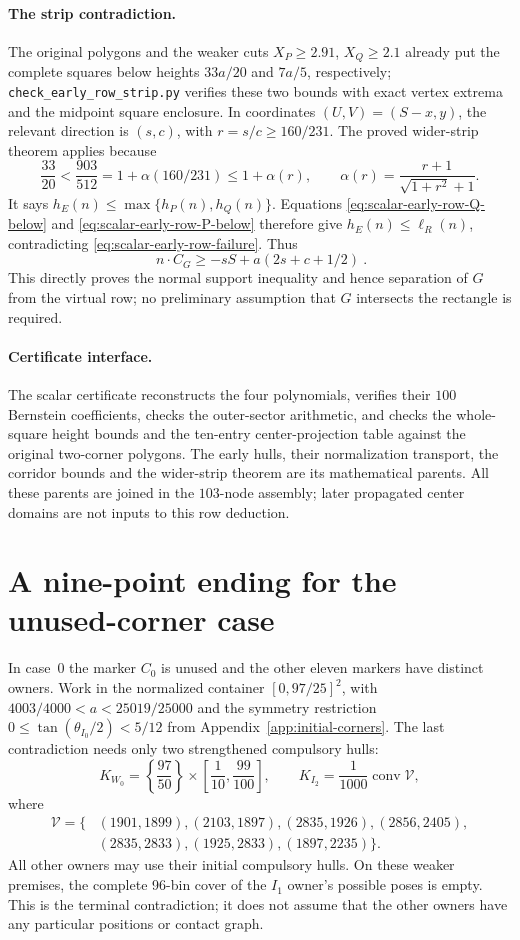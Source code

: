\documentclass[11pt]{article}
\begin{document}
\paragraph{The strip contradiction.}
The original polygons and the weaker cuts $X_P\ge2.91$, $X_Q\ge2.1$
already put the complete squares below heights $33a/20$ and $7a/5$,
respectively; \texttt{check\_early\_row\_strip.py} verifies these
two bounds with exact vertex extrema and the midpoint square enclosure.
In coordinates $(U,V)=(S-x,y)$, the relevant direction is $(s,c)$,
with $r=s/c\ge160/231$. The proved wider-strip theorem applies because
\[
 \frac{33}{20}<\frac{903}{512}
 =1+\alpha(160/231)\le1+\alpha(r),\qquad
 \alpha(r)=\frac{r+1}{\sqrt{1+r^2}+1}.
\]
It says $h_E(n)\le\max\{h_P(n),h_Q(n)\}$.
Equations \eqref{eq:scalar-early-row-Q-below} and
\eqref{eq:scalar-early-row-P-below} therefore give
$h_E(n)\le\ell_R(n)$, contradicting
\eqref{eq:scalar-early-row-failure}. Thus
\[
 \boxed{\ n\cdot C_G\ge-sS+a(2s+c+1/2)\ }.
\]
This directly proves the normal support inequality and hence separation
of $G$ from the virtual row; no preliminary assumption that $G$ intersects
the rectangle is required.


\paragraph{Certificate interface.}
The scalar certificate reconstructs the four polynomials, verifies their
$100$ Bernstein coefficients, checks the outer-sector arithmetic, and
checks the whole-square height bounds and the ten-entry center-projection
table against the original two-corner polygons. The early hulls, their
normalization transport, the corridor bounds and the wider-strip theorem
are its mathematical parents. All these parents are joined in the
$103$-node assembly; later propagated center domains are not inputs to
this row deduction.

\section{A nine-point ending for the unused-corner case}
In case~0 the marker $C_0$ is unused and the other eleven markers have
distinct owners.  Work in the normalized container $[0,97/25]^2$, with
$4003/4000<a<25019/25000$ and the symmetry restriction
$0\le\tan(\theta_{I_0}/2)<5/12$ from
Appendix~\ref{app:initial-corners}.
The last contradiction needs only two strengthened compulsory hulls:
\[
 K_{W_0}=\left\{\frac{97}{50}\right\}
       \times\left[\frac1{10},\frac{99}{100}\right],
 \qquad K_{I_2}=\frac1{1000}\operatorname{conv}\mathcal V,
\]
where
\[
\begin{aligned}
\mathcal V=\bigl\{&(1901,1899),(2103,1897),(2835,1926),(2856,2405),\\
                 &(2835,2833),(1925,2833),(1897,2235)\bigr\}.
\end{aligned}
\]
All other owners may use their initial compulsory hulls.  On these weaker
premises, the complete 96-bin cover of the $I_1$ owner's possible poses
is empty.  This is the terminal contradiction; it does not assume that
the other owners have any particular positions or contact graph.
\end{document}
